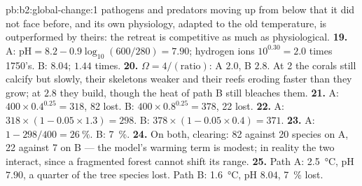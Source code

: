 \begin{solution}{pb:b2:global-change:1}
pathogens and predators moving up from below that it did not face
before, and its own physiology, adapted to the old temperature, is
outperformed by theirs: the retreat is competitive as much as
physiological.
\textbf{19.} A: $\mathrm{pH} = 8.2 - 0.9\log_{10}(600/280) = 7.90$;
hydrogen ions $10^{0.30} = 2.0$ times 1750's. B: $8.04$; $1.44$
times.
\textbf{20.} $\Omega = 4/(\text{ratio})$: A $2.0$, B $2.8$. At 2 the
corals still calcify but slowly, their skeletons weaker and their
reefs eroding faster than they grow; at $2.8$ they build, though
the heat of path B still bleaches them.
\textbf{21.} A: $400\times 0.4^{0.25} = 318$, 82 lost. B:
$400\times 0.8^{0.25} = 378$, 22 lost.
\textbf{22.} A: $318\times(1 - 0.05\times 1.3) = 298$. B:
$378\times(1 - 0.05\times 0.4) = 371$.
\textbf{23.} A: $1 - 298/400 = \qty{26}{\%}$. B: \qty{7}{\%}.
\textbf{24.} On both, clearing: 82 against 20 species on A, 22
against 7 on B --- the model's warming term is modest; in reality
the two interact, since a fragmented forest cannot shift its range.
\textbf{25.} Path A: \qty{2.5}{\celsius}, pH $7.90$, a quarter of the
tree species lost. Path B: \qty{1.6}{\celsius}, pH $8.04$, \qty{7}{\%}
lost.
\end{solution}
